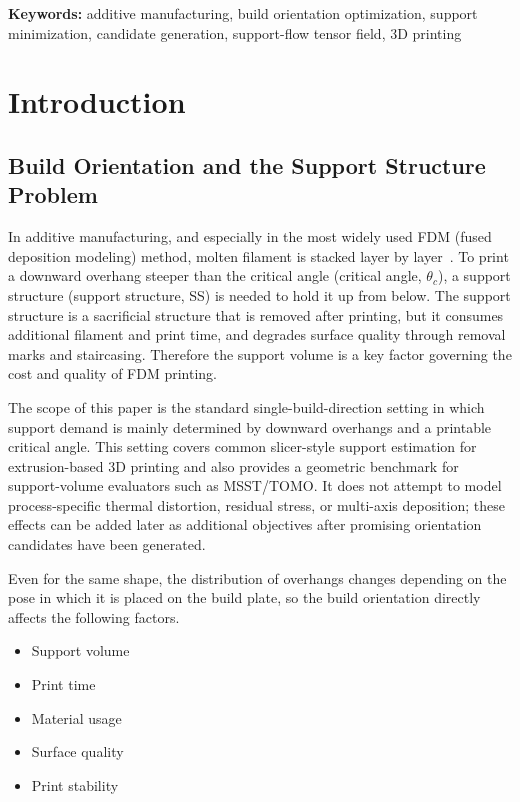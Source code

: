 \documentclass[11pt,a4paper]{article}
\begin{document}
\noindent\textbf{Keywords:} additive manufacturing, build orientation optimization, support minimization, candidate generation, support-flow tensor field, 3D printing

\section{Introduction}

\subsection{Build Orientation and the Support Structure Problem}

In additive manufacturing, and especially in the most widely used FDM (fused deposition modeling) method,
molten filament is stacked layer by layer~\cite{gibson}.
To print a downward overhang steeper than the critical angle (critical angle, $\theta_c$),
a support structure (support structure, SS) is needed to hold it up from below.
The support structure is a sacrificial structure that is removed after printing, but it consumes additional filament and print time,
and degrades surface quality through removal marks and staircasing.
Therefore the support volume is a key factor governing the cost and quality of FDM printing.

The scope of this paper is the standard single-build-direction setting in which support demand is mainly determined by downward overhangs and a printable critical angle.
This setting covers common slicer-style support estimation for extrusion-based 3D printing and also provides a geometric benchmark for support-volume evaluators such as MSST/TOMO.
It does not attempt to model process-specific thermal distortion, residual stress, or multi-axis deposition; these effects can be added later as additional objectives after promising orientation candidates have been generated.

Even for the same shape, the distribution of overhangs changes depending on the pose in which it is placed on the build plate,
so the build orientation directly affects the following factors.

\begin{itemize}
\item Support volume
\item Print time
\item Material usage
\item Surface quality
\item Print stability
\end{itemize}
\end{document}
